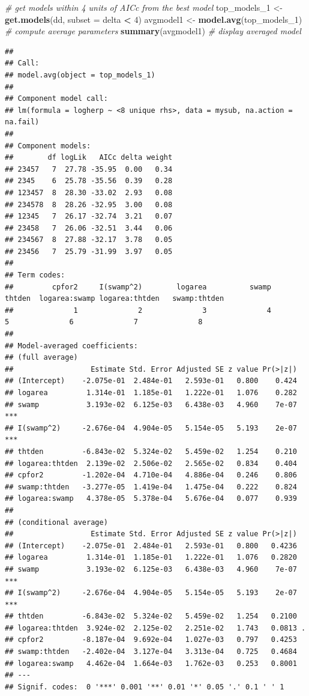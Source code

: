 \documentclass[
  12pt,
]{book}
\newenvironment{Shaded}{\begin{snugshade}}{\end{snugshade}}
\newcommand{\CommentTok}[1]{\textcolor[rgb]{0.56,0.35,0.01}{\textit{#1}}}
\newcommand{\DataTypeTok}[1]{\textcolor[rgb]{0.13,0.29,0.53}{#1}}
\newcommand{\DecValTok}[1]{\textcolor[rgb]{0.00,0.00,0.81}{#1}}
\newcommand{\KeywordTok}[1]{\textcolor[rgb]{0.13,0.29,0.53}{\textbf{#1}}}
\newcommand{\NormalTok}[1]{#1}
\newcommand{\OperatorTok}[1]{\textcolor[rgb]{0.81,0.36,0.00}{\textbf{#1}}}
\newcommand{\StringTok}[1]{\textcolor[rgb]{0.31,0.60,0.02}{#1}}
\begin{document}
\begin{Shaded}
\begin{Highlighting}[]
\CommentTok{\# get models within 4 units of AICc from the best model}
\NormalTok{top\_models\_}\DecValTok{1}\NormalTok{ \textless{}{-}}\StringTok{ }\KeywordTok{get.models}\NormalTok{(dd, }\DataTypeTok{subset =}\NormalTok{ delta }\OperatorTok{\textless{}}\StringTok{ }\DecValTok{4}\NormalTok{)}
\NormalTok{avgmodel1 \textless{}{-}}\StringTok{ }\KeywordTok{model.avg}\NormalTok{(top\_models\_}\DecValTok{1}\NormalTok{) }\CommentTok{\# compute average parameters}
\KeywordTok{summary}\NormalTok{(avgmodel1) }\CommentTok{\# display averaged model}
\end{Highlighting}
\end{Shaded}

\begin{verbatim}
## 
## Call:
## model.avg(object = top_models_1)
## 
## Component model call: 
## lm(formula = logherp ~ <8 unique rhs>, data = mysub, na.action = na.fail)
## 
## Component models: 
##        df logLik   AICc delta weight
## 23457   7  27.78 -35.95  0.00   0.34
## 2345    6  25.78 -35.56  0.39   0.28
## 123457  8  28.30 -33.02  2.93   0.08
## 234578  8  28.26 -32.95  3.00   0.08
## 12345   7  26.17 -32.74  3.21   0.07
## 23458   7  26.06 -32.51  3.44   0.06
## 234567  8  27.88 -32.17  3.78   0.05
## 23456   7  25.79 -31.99  3.97   0.05
## 
## Term codes: 
##         cpfor2     I(swamp^2)        logarea          swamp         thtden  logarea:swamp logarea:thtden   swamp:thtden 
##              1              2              3              4              5              6              7              8 
## 
## Model-averaged coefficients:  
## (full average) 
##                  Estimate Std. Error Adjusted SE z value Pr(>|z|)    
## (Intercept)    -2.075e-01  2.484e-01   2.593e-01   0.800    0.424    
## logarea         1.314e-01  1.185e-01   1.222e-01   1.076    0.282    
## swamp           3.193e-02  6.125e-03   6.438e-03   4.960    7e-07 ***
## I(swamp^2)     -2.676e-04  4.904e-05   5.154e-05   5.193    2e-07 ***
## thtden         -6.843e-02  5.324e-02   5.459e-02   1.254    0.210    
## logarea:thtden  2.139e-02  2.506e-02   2.565e-02   0.834    0.404    
## cpfor2         -1.202e-04  4.710e-04   4.886e-04   0.246    0.806    
## swamp:thtden   -3.277e-05  1.419e-04   1.475e-04   0.222    0.824    
## logarea:swamp   4.378e-05  5.378e-04   5.676e-04   0.077    0.939    
##  
## (conditional average) 
##                  Estimate Std. Error Adjusted SE z value Pr(>|z|)    
## (Intercept)    -2.075e-01  2.484e-01   2.593e-01   0.800   0.4236    
## logarea         1.314e-01  1.185e-01   1.222e-01   1.076   0.2820    
## swamp           3.193e-02  6.125e-03   6.438e-03   4.960    7e-07 ***
## I(swamp^2)     -2.676e-04  4.904e-05   5.154e-05   5.193    2e-07 ***
## thtden         -6.843e-02  5.324e-02   5.459e-02   1.254   0.2100    
## logarea:thtden  3.924e-02  2.125e-02   2.251e-02   1.743   0.0813 .  
## cpfor2         -8.187e-04  9.692e-04   1.027e-03   0.797   0.4253    
## swamp:thtden   -2.402e-04  3.127e-04   3.313e-04   0.725   0.4684    
## logarea:swamp   4.462e-04  1.664e-03   1.762e-03   0.253   0.8001    
## ---
## Signif. codes:  0 '***' 0.001 '**' 0.01 '*' 0.05 '.' 0.1 ' ' 1
\end{verbatim}
\end{document}
